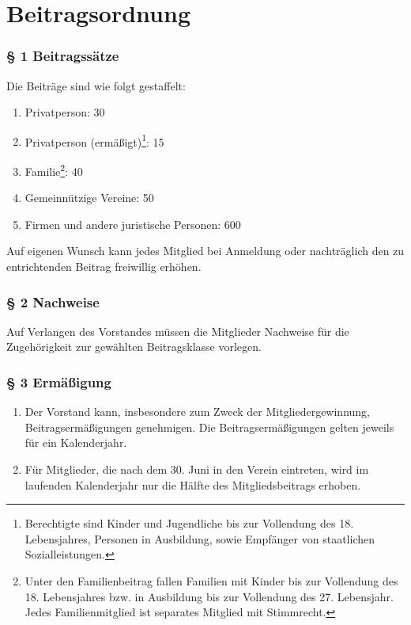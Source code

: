 \documentclass[a4paper,10pt]{article}
\begin{document}
\section{Beitragsordnung}

\subsubsection*{§ 1 Beitragssätze}
Die Beiträge sind wie folgt gestaffelt:
\begin{enumerate}
  \item Privatperson: 30\textsf{\texteuro}
  \item Privatperson (ermäßigt)\footnote{Berechtigte sind Kinder und Jugendliche
    bis zur Vollendung des 18. Lebensjahres, Personen in Ausbildung, sowie
  Empfänger von staatlichen Sozialleistungen.}: 15\textsf{\texteuro}
\item Familie\footnote{Unter den Familienbeitrag fallen Familien mit Kinder bis
    zur Vollendung des 18. Lebensjahres bzw. in Ausbildung bis zur Vollendung des
    27. Lebensjahr. Jedes Familienmitglied ist separates Mitglied mit
  Stimmrecht.}: 40\textsf{\texteuro}
\item Gemeinnützige Vereine: 50\textsf{\texteuro}
\item Firmen und andere juristische Personen: 600\textsf{\texteuro}
\end{enumerate}
Auf eigenen Wunsch kann jedes Mitglied bei Anmeldung oder nachträglich den zu
entrichtenden Beitrag freiwillig erhöhen.


\subsubsection*{§ 2 Nachweise}
Auf Verlangen des Vorstandes müssen die Mitglieder Nachweise für die
Zugehörigkeit zur gewählten Beitragsklasse vorlegen.


\subsubsection*{§ 3 Ermäßigung}
\begin{enumerate}
  \item Der Vorstand kann, insbesondere zum Zweck der Mitgliedergewinnung,
Beitragsermäßigungen genehmigen. Die Beitragsermäßigungen gelten jeweils für ein
Kalenderjahr.
\item Für Mitglieder, die nach dem 30. Juni in den Verein eintreten, wird im
  laufenden Kalenderjahr nur die Hälfte des Mitgliedsbeitrags erhoben.
\end{enumerate}
\end{document}
